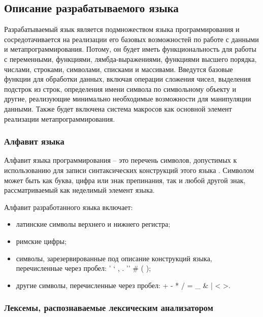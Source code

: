 \subsection{Описание разрабатываемого языка}

Разрабатываемый язык является подмножеством языка программирования  и сосредотачивается на реализации его базовых возможностей по работе с данными и метапрограммирования. Потому, он будет иметь функциональность для работы с переменными, функциями, лямбда-выражениями, функциями высшего порядка, числами, строками, символами, списками и массивами. Введутся базовые функции для обработки данных, включая операции сложения чисел, выделения подстрок из строк, определения имени символа по символьному объекту и другие, реализующие минимально необходимые возможности для манипуляции данными. Также будет включена система макросов как основной элемент реализации метапрограммирования.

\subsubsection{Алфавит языка}
Алфавит языка программирования -- это перечень символов, допустимых к использованию для записи синтаксических конструкций этого языка \cite{e4}. Символом может быть как буква, цифра или знак препинания, так и любой другой знак, рассматриваемый как неделимый элемент языка.

Алфавит разработанного языка включает:
\begin{itemize}
	\item латинские символы верхнего и нижнего регистра;
	\item римские цифры;
	\item символы, зарезервированные под описание конструкций языка, перечисленные через пробел: ' ` , . '' \# ( );
	\item другие символы, перечисленные через пробел: + - * / = \_ \& | < >.
\end{itemize}

\subsubsection{Лексемы, распознаваемые лексическим анализатором}

